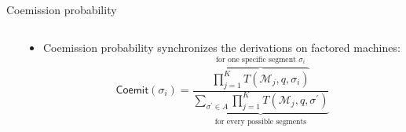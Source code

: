\begin{frame}[fragile]{Coemission probability}
\begin{columns}
\begin{column}{0.45\textwidth}

\begin{center}
\end{center}

\end{column}
\begin{column}{0.55\textwidth}
\vspace{0.2cm}
\begin{itemize}
\item Coemission probability synchronizes the derivations on factored machines:
\begin{equation*}
\textsf{Coemit}(\sigma_{i})=\underbrace{\frac{\overbrace{\prod_{j=1}^{K} T(\mathcal{M}_{j}, q, \sigma_{i})}^{\text{for one specific segment $\sigma_i$}}}{\sum_{\sigma^{\prime} \in A} \prod_{j=1}^{K} T\left(\mathcal{M}_{j}, q, \sigma^{\prime}\right)}}_{\text{for every possible segments}}
\end{equation*}
\end{itemize}

\end{column}
\end{columns}
\end{frame}

